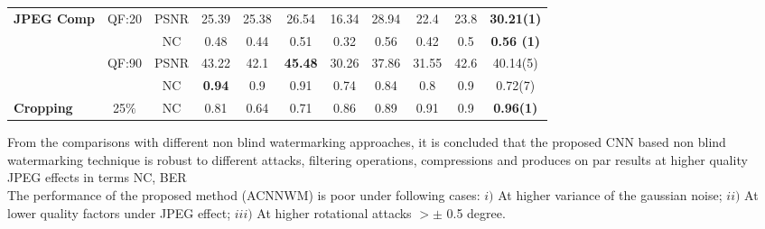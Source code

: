 \begin{table*}
{\begin{tabular}{@{}lcccccccccc@{}}
{\bf JPEG Comp} 		& QF:20 & PSNR 		&{25.39}  & {25.38} & {26.54} & {16.34}& 28.94		&{22.4}	&{23.8} & \bf 30.21(1) \\
{ } 					& { } 	& NC 		&{0.48}   & {0.44}  & {0.51} & {0.32}& 0.56			&{0.42}	&{0.5}	& \bf 0.56 (1)\\ 
{ } 					& QF:90 & PSNR 		&{ 43.22}  & {42.1} & {\bf 45.48} & {30.26}&  37.86	&{31.55}	&{42.6}		& 40.14(5) \\
{ } 					& { } 	& NC 		&{\bf 0.94}   & {0.9}  & {0.91} & {0.74}&  0.84 	&{0.8}	&{0.9}		& 0.72(7) \\ 
{\bf Cropping}    		& 25$\%$& NC 		&{0.81}   & {0.64}  & {0.71} & {0.86}&  0.89 		&{0.91} &{0.9}		& \bf 0.96(1) \\
\bottomrule
\end{tabular}}
\end{table*}

From the comparisons with different non blind watermarking approaches, it is concluded that the proposed CNN based non blind watermarking technique is robust to different attacks, filtering operations, compressions and produces on par results at higher quality JPEG effects in terms NC, BER \\
 
 The performance of the proposed method (ACNNWM) is poor under following cases: $i)$ At higher variance of the gaussian noise; $ii)$ At lower quality factors under JPEG effect; $iii)$  At higher rotational attacks $>\pm$ 0.5 degree.


 

